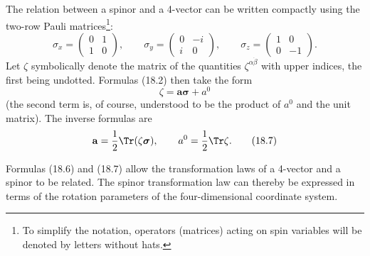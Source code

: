 The relation between a spinor and a 4-vector can be written compactly using the two-row Pauli matrices\footnote{To simplify the notation, operators (matrices) acting on spin variables will be denoted by letters without hats.}:
\begin{equation}
\sigma_x=\begin{pmatrix}0&1\\1&0\end{pmatrix},\qquad
\sigma_y=\begin{pmatrix}0&-i\\i&0\end{pmatrix},\qquad
\sigma_z=\begin{pmatrix}1&0\\0&-1\end{pmatrix}.
\tag{18.5}
\end{equation}
Let $\zeta$ symbolically denote the matrix of the quantities $\zeta^{\alpha\dot\beta}$ with upper indices, the first being undotted. Formulas (18.2) then take the form
\begin{equation}
\zeta=\mathbf a\boldsymbol\sigma+a^0
\tag{18.6}
\end{equation}
(the second term is, of course, understood to be the product of $a^0$ and the unit matrix). The inverse formulas are
\begin{equation}
\mathbf a=\frac12\Tr(\zeta\boldsymbol\sigma),
\qquad
a^0=\frac12\Tr\zeta.
\tag{18.7}
\end{equation}

Formulas (18.6) and (18.7) allow the transformation laws of a 4-vector and a spinor to be related. The spinor transformation law can thereby be expressed in terms of the rotation parameters of the four-dimensional coordinate system.

